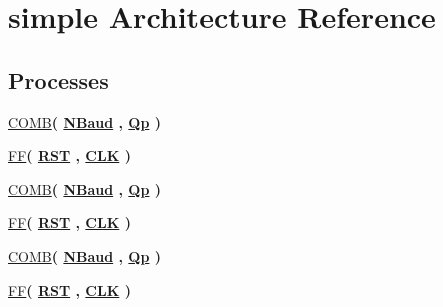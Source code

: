 \hypertarget{class_baud_rate_1_1simple}{}\section{simple Architecture Reference}
\label{class_baud_rate_1_1simple}
\subsection*{Processes}
 \begin{DoxyCompactItemize}
\item 
\hyperlink{class_baud_rate_1_1simple_a355f8dd5b88955442b90dae54f594c1d}{C\+O\+M\+B}{\bfseries  ( {\bfseries {\bfseries \hyperlink{class_baud_rate_af99e9846fb1525d8781a8861c5405ac6}{N\+Baud}} \textcolor{vhdlchar}{ }} , {\bfseries {\bfseries \hyperlink{class_baud_rate_1_1simple_a193e599da42febaea5351ec3bb05dc52}{Qp}} \textcolor{vhdlchar}{ }} )}
\item 
\hyperlink{class_baud_rate_1_1simple_a596f3c3b24f9699291119d701202e7d2}{F\+F}{\bfseries  ( {\bfseries {\bfseries \hyperlink{class_baud_rate_a98682ef7de2714e5bab788a2e2ff1b7f}{R\+S\+T}} \textcolor{vhdlchar}{ }} , {\bfseries {\bfseries \hyperlink{class_baud_rate_ab5d0ea9e968d49d94da9db07a979d402}{C\+L\+K}} \textcolor{vhdlchar}{ }} )}
\item 
\hyperlink{class_baud_rate_1_1simple_a355f8dd5b88955442b90dae54f594c1d}{C\+O\+M\+B}{\bfseries  ( {\bfseries {\bfseries \hyperlink{class_baud_rate_af99e9846fb1525d8781a8861c5405ac6}{N\+Baud}} \textcolor{vhdlchar}{ }} , {\bfseries {\bfseries \hyperlink{class_baud_rate_1_1simple_a193e599da42febaea5351ec3bb05dc52}{Qp}} \textcolor{vhdlchar}{ }} )}
\item 
\hyperlink{class_baud_rate_1_1simple_a596f3c3b24f9699291119d701202e7d2}{F\+F}{\bfseries  ( {\bfseries {\bfseries \hyperlink{class_baud_rate_a98682ef7de2714e5bab788a2e2ff1b7f}{R\+S\+T}} \textcolor{vhdlchar}{ }} , {\bfseries {\bfseries \hyperlink{class_baud_rate_ab5d0ea9e968d49d94da9db07a979d402}{C\+L\+K}} \textcolor{vhdlchar}{ }} )}
\item 
\hyperlink{class_baud_rate_1_1simple_a355f8dd5b88955442b90dae54f594c1d}{C\+O\+M\+B}{\bfseries  ( {\bfseries {\bfseries \hyperlink{class_baud_rate_af99e9846fb1525d8781a8861c5405ac6}{N\+Baud}} \textcolor{vhdlchar}{ }} , {\bfseries {\bfseries \hyperlink{class_baud_rate_1_1simple_a193e599da42febaea5351ec3bb05dc52}{Qp}} \textcolor{vhdlchar}{ }} )}
\item 
\hyperlink{class_baud_rate_1_1simple_a596f3c3b24f9699291119d701202e7d2}{F\+F}{\bfseries  ( {\bfseries {\bfseries \hyperlink{class_baud_rate_a98682ef7de2714e5bab788a2e2ff1b7f}{R\+S\+T}} \textcolor{vhdlchar}{ }} , {\bfseries {\bfseries \hyperlink{class_baud_rate_ab5d0ea9e968d49d94da9db07a979d402}{C\+L\+K}} \textcolor{vhdlchar}{ }} )}
\end{DoxyCompactItemize}
